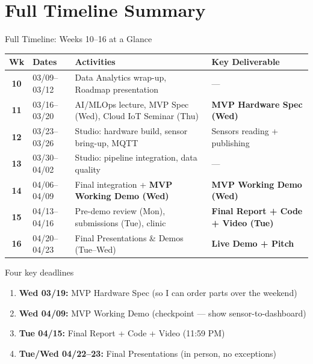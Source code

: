 \documentclass[aspectratio=169,11pt]{beamer}
\begin{document}
\section{Full Timeline Summary}

\begin{frame}{Full Timeline: Weeks 10--16 at a Glance}
    \vspace{0.1cm}
    \begin{center}
    \scriptsize
    \begin{tabular}{clp{5.5cm}p{4cm}}
        \toprule
        \textbf{Wk} & \textbf{Dates} & \textbf{Activities} & \textbf{Key Deliverable} \\
        \midrule
        \textbf{10} & 03/09--03/12 & Data Analytics wrap-up, Roadmap presentation & --- \\
        \midrule
        \textbf{11} & 03/16--03/20 & AI/MLOps lecture, MVP Spec (Wed), Cloud IoT Seminar (Thu) & \textbf{MVP Hardware Spec (Wed)} \\
        \midrule
        \textbf{12} & 03/23--03/26 & Studio: hardware build, sensor bring-up, MQTT & Sensors reading + publishing \\
        \midrule
        \textbf{13} & 03/30--04/02 & Studio: pipeline integration, data quality & --- \\
        \midrule
        \textbf{14} & 04/06--04/09 & Final integration + \textbf{MVP Working Demo (Wed)} & \textbf{MVP Working Demo (Wed)} \\
        \midrule
        \textbf{15} & 04/13--04/16 & Pre-demo review (Mon), submissions (Tue), clinic & \textbf{Final Report + Code + Video (Tue)} \\
        \midrule
        \textbf{16} & 04/20--04/23 & Final Presentations \& Demos (Tue--Wed) & \textbf{Live Demo + Pitch} \\
        \bottomrule
    \end{tabular}
    \normalsize
    \end{center}

    \vspace{0.2cm}
    \begin{alertblock}{Four key deadlines}
        \begin{enumerate}
            \item \textbf{Wed 03/19:} MVP Hardware Spec (so I can order parts over the weekend)
            \item \textbf{Wed 04/09:} MVP Working Demo (checkpoint --- show sensor-to-dashboard)
            \item \textbf{Tue 04/15:} Final Report + Code + Video (11:59 PM)
            \item \textbf{Tue/Wed 04/22--23:} Final Presentations (in person, no exceptions)
        \end{enumerate}
    \end{alertblock}
\end{frame}
\end{document}

